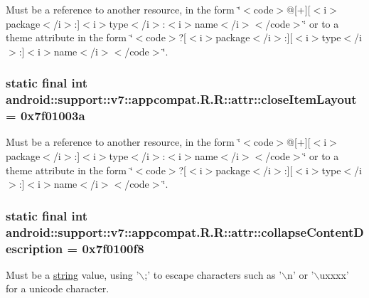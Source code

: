 Must be a reference to another resource, in the form \char`\"{}$<$code$>$@\mbox{[}+\mbox{]}\mbox{[}$<$i$>$package$<$/i$>$:\mbox{]}$<$i$>$type$<$/i$>$:$<$i$>$name$<$/i$>$$<$/code$>$\char`\"{} or to a theme attribute in the form \char`\"{}$<$code$>$?\mbox{[}$<$i$>$package$<$/i$>$:\mbox{]}\mbox{[}$<$i$>$type$<$/i$>$:\mbox{]}$<$i$>$name$<$/i$>$$<$/code$>$\char`\"{}. \hypertarget{classandroid_1_1support_1_1v7_1_1appcompat_1_1_r_1_1attr_fe652bc1007636ac2e1fba04dda995db}{
\subsubsection[{closeItemLayout}]{\setlength{\rightskip}{0pt plus 5cm}static final int android::support::v7::appcompat.R.R::attr::closeItemLayout = 0x7f01003a}}
\label{classandroid_1_1support_1_1v7_1_1appcompat_1_1_r_1_1attr_fe652bc1007636ac2e1fba04dda995db}


Must be a reference to another resource, in the form \char`\"{}$<$code$>$@\mbox{[}+\mbox{]}\mbox{[}$<$i$>$package$<$/i$>$:\mbox{]}$<$i$>$type$<$/i$>$:$<$i$>$name$<$/i$>$$<$/code$>$\char`\"{} or to a theme attribute in the form \char`\"{}$<$code$>$?\mbox{[}$<$i$>$package$<$/i$>$:\mbox{]}\mbox{[}$<$i$>$type$<$/i$>$:\mbox{]}$<$i$>$name$<$/i$>$$<$/code$>$\char`\"{}. \hypertarget{classandroid_1_1support_1_1v7_1_1appcompat_1_1_r_1_1attr_4ab02fd788cddd36bff76138ce43f9eb}{
\subsubsection[{collapseContentDescription}]{\setlength{\rightskip}{0pt plus 5cm}static final int android::support::v7::appcompat.R.R::attr::collapseContentDescription = 0x7f0100f8}}
\label{classandroid_1_1support_1_1v7_1_1appcompat_1_1_r_1_1attr_4ab02fd788cddd36bff76138ce43f9eb}


Must be a \hyperlink{classandroid_1_1support_1_1v7_1_1appcompat_1_1_r_1_1string}{string} value, using '$\backslash$;' to escape characters such as '$\backslash$n' or '$\backslash$uxxxx' for a unicode character. 

